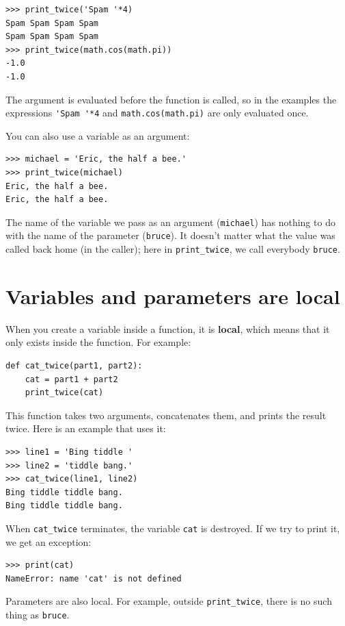 \documentclass[10pt]{book}
\begin{document}
\begin{verbatim}
>>> print_twice('Spam '*4)
Spam Spam Spam Spam
Spam Spam Spam Spam
>>> print_twice(math.cos(math.pi))
-1.0
-1.0
\end{verbatim}
%
The argument is evaluated before the function is called, so
in the examples the expressions \verb"'Spam '*4" and
{\tt math.cos(math.pi)} are only evaluated once.

You can also use a variable as an argument:

\begin{verbatim}
>>> michael = 'Eric, the half a bee.'
>>> print_twice(michael)
Eric, the half a bee.
Eric, the half a bee.
\end{verbatim}
%
The name of the variable we pass as an argument ({\tt michael}) has
nothing to do with the name of the parameter ({\tt bruce}).  It
doesn't matter what the value was called back home (in the caller);
here in \verb"print_twice", we call everybody {\tt bruce}.


\section{Variables and parameters are local}

When you create a variable inside a function, it is {\bf local},
which means that it only
exists inside the function.  For example:

\begin{verbatim}
def cat_twice(part1, part2):
    cat = part1 + part2
    print_twice(cat)
\end{verbatim}
%
This function takes two arguments, concatenates them, and prints
the result twice.  Here is an example that uses it:

\begin{verbatim}
>>> line1 = 'Bing tiddle '
>>> line2 = 'tiddle bang.'
>>> cat_twice(line1, line2)
Bing tiddle tiddle bang.
Bing tiddle tiddle bang.
\end{verbatim}
%
When \verb"cat_twice" terminates, the variable {\tt cat}
is destroyed.  If we try to print it, we get an exception:

\begin{verbatim}
>>> print(cat)
NameError: name 'cat' is not defined
\end{verbatim}
%
Parameters are also local.
For example, outside \verb"print_twice", there is no
such thing as {\tt bruce}.
\end{document}
